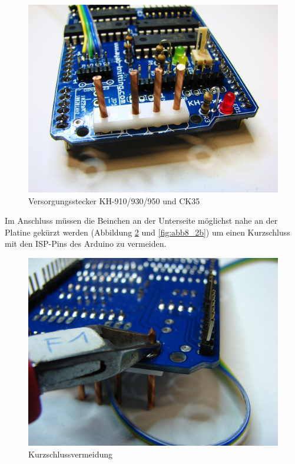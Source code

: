 \documentclass[fleqn,10pt]{SelfArx} %
\begin{document}
\begin{figure}[tbhp]\centering
\includegraphics[width=\linewidth]{abb8_1}
\caption{Versorgungsstecker KH-910/930/950 und CK35}
\label{fig:abb8_1}
\end{figure}

Im Anschluss müssen die Beinchen an der Unterseite möglichst nahe an der Platine gekürzt werden (Abbildung \ref{fig:abb8_2} und \ref{fig:abb8_2b}) um einen Kurzschluss mit den ISP-Pins des Arduino zu vermeiden.\par

\begin{figure}[tbhp]\centering
\includegraphics[width=\linewidth]{abb8_2}
\caption{Kurzschlussvermeidung}
\label{fig:abb8_2}
\end{figure}
\end{document}
